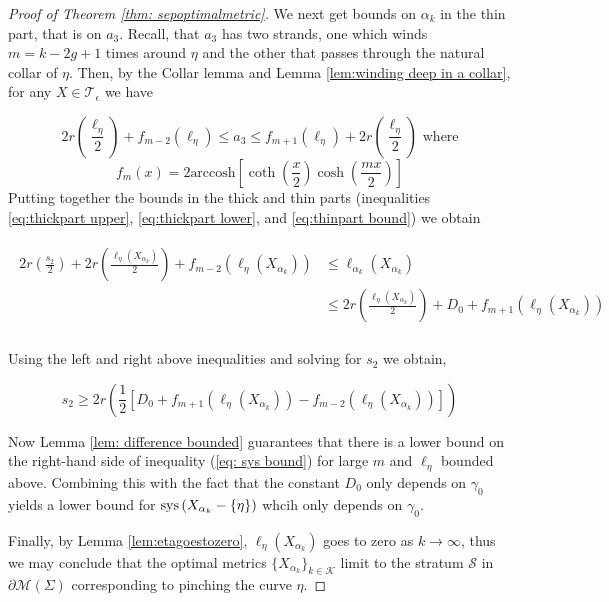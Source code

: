 \documentclass[12pt]{amsart}
\numberwithin{equation}{section}
\theoremstyle{plain}
\begin{document}
\begin{proof}[Proof of Theorem \ref{thm: sepoptimalmetric}]
We next get bounds on $\alpha_{k}$ in the thin part,
that is on $a_3$. Recall,  that $a_3$ has two strands, one which winds 
$m=k-2g+1$ times around $\eta$ and the other that passes through the natural collar of $\eta$.
Then, by the Collar lemma and Lemma \ref{lem:winding deep in a collar}, for any $X \in \mathcal{T}_{\epsilon}$ we have

\begin{equation} \label{eq:thinpart bound}
  2 r \left( \frac{\ell_{\eta}} {2}\right) + f_{m-2}(\ell_{\eta})\leq 
 a_3  
 \leq
 f_{m+1}(\ell_{\eta}) + 2 r \left(\frac{\ell_{\eta}} {2}\right) \text{  where}
\end{equation}
\begin{equation}
 f_{m}(x)=
 2\text{arccosh}\left[\coth \left(\frac{x}{2}\right)  \cosh \left(\frac{mx}{2} \right)\right]
\end{equation}
Putting together the bounds in the thick and thin parts (inequalities \ref{eq:thickpart upper}, \ref{eq:thickpart lower}, and \ref{eq:thinpart bound}) we obtain

\begin{align}
\begin{split}
  2r\left(\frac{s_2}{2}\right) + 2r\left(\frac{\ell_{\eta}(X_{\alpha_k})} {2}\right) +  f_{m-2}(\ell_{\eta}(X_{\alpha_k})) 
  &\leq 
 \ell_{\alpha_k}(X_{\alpha_{k}}) \\
 & \leq 2r\left(\frac{\ell_{\eta}(X_{\alpha_k})} {2}\right) +
D_0+f_{m+1}(\ell_{\eta}(X_{\alpha_k}))\\
\end{split}
\end{align}


Using the left and right above inequalities and solving for $s_2$ we obtain,


\begin{equation}\label{eq: sys bound}
s_2 \geq 2 r\left( \frac{1}{2}\left[D_0+f_{m+1}(\ell_{\eta}(X_{\alpha_k}))-f_{m-2}(\ell_{\eta}(X_{\alpha_k}))\right]\right)
\end{equation}

Now Lemma \ref{lem: difference bounded} guarantees that there is a lower bound on the right-hand side of inequality (\ref{eq: sys bound}) for large $m$ and $\ell_{\eta}$ bounded above. Combining this with the fact that the constant $D_0$ only depends on 
$\gamma_{0}$ yields a lower bound for $\textup{sys}\left(X_{\alpha_{k}}-\{\eta\}\right)$ whcih only depends on $\gamma_0$.

Finally, 
by Lemma \ref{lem:etagoestozero},  $\ell_{\eta}(X_{\alpha_k})$ goes to zero as $k \rightarrow \infty$, thus we may conclude that the optimal metrics 
$\{X_{\alpha_{k}}\}_{k  \in \mathcal{K}}$ limit  to the stratum $\mathcal{S}$ in $\partial\mathcal{M}(\Sigma)$ corresponding to pinching the curve
$\eta$.
\end{proof}
\end{document}

